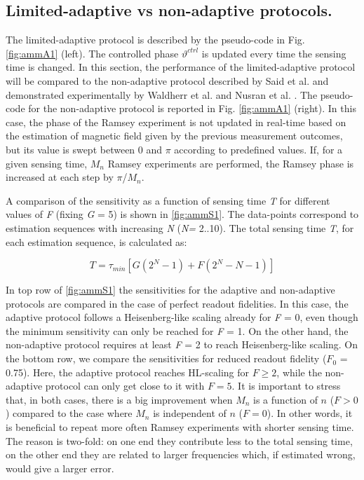\subsection{Limited-adaptive vs non-adaptive protocols.} 
The limited-adaptive protocol \cite{Cappellaro_Phys.Rev.A_2012} is described by the pseudo-code in Fig. \ref{fig:ammA1} (left). The controlled phase $\vartheta^{ctrl}$ is updated every time the sensing time is changed. 
In this section, the performance of the limited-adaptive protocol will be compared to the non-adaptive protocol described by Said et al. \cite{Said_Phys.Rev.B_2011} and demonstrated experimentally by Waldherr et al. \cite{Waldherr_NatNano_2012} and Nusran et al. \cite{Nusran_NatNano_2012}. The pseudo-code for the non-adaptive protocol is reported in Fig. \ref{fig:ammA1} (right). In this case, the phase of the Ramsey experiment is not updated in real-time based on the estimation of magnetic field given by the previous measurement outcomes, but its value is swept between 0 and $\pi$ according to predefined values. If, for a given sensing time, $M_n$ Ramsey experiments are performed, the Ramsey phase is increased at each step by $\pi$/$M_n$.


A comparison of the sensitivity as a function of sensing time \textit{T} for different values of \textit{F} (fixing \textit{G} = 5) is shown in \ref{fig:ammS1}. The data-points correspond to estimation sequences with increasing \textit{N} (\textit{N=} 2..10). The total sensing time \textit{T}, for each estimation sequence, is calculated as:

\begin{equation}
T=\tau_{min}[G(2^N -1)+ F(2^N - N - 1)]
\end{equation}

In top row of \ref{fig:ammS1} the sensitivities for the adaptive and non-adaptive protocols are compared in the case of perfect readout fidelities. In this case, the adaptive protocol follows a Heisenberg-like scaling already for \textit{F} = 0, even though the minimum sensitivity can only be reached for \textit{F} = 1. On the other hand, the non-adaptive protocol requires at least \textit{F} = 2 to reach Heisenberg-like scaling. On the bottom row, we compare the sensitivities for reduced readout fidelity ($F_0$ = 0.75). Here, the adaptive protocol reaches HL-scaling for $F\geq2$, while the non-adaptive protocol can only get close to it with $F=5$. 
It is important to stress that, in both cases, there is a big improvement when $M_n$ is a function of $n$ ($F>0$) compared to the case where $M_n$ is independent of $n$ ($F=0$). In other words, it is beneficial to repeat more often Ramsey experiments with shorter sensing time. The reason is two-fold: on one end they contribute less to the total sensing time, on the other end they are related to larger frequencies which, if estimated wrong, would give a larger error.

